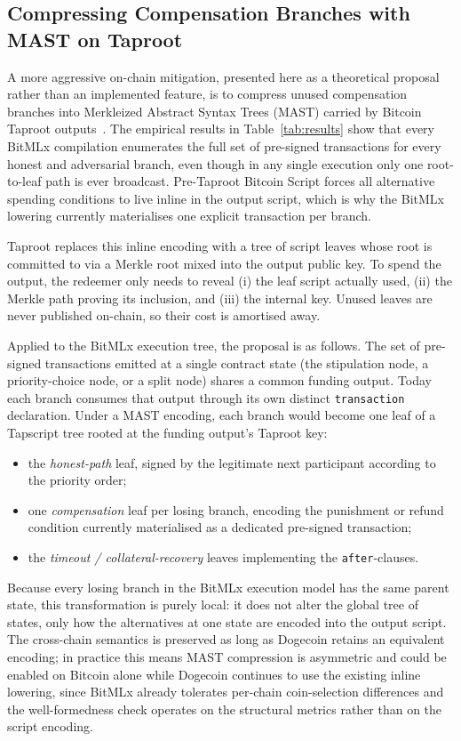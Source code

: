 \documentclass[journal]{IEEEtran}
\begin{document}
\subsection{Compressing Compensation Branches with MAST on Taproot}
\label{sec:mast}

A more aggressive on-chain mitigation, presented here as a theoretical proposal rather than an implemented feature, is to compress unused compensation branches into Merkleized Abstract Syntax Trees (MAST) carried by Bitcoin Taproot outputs~\cite{nick2020bip341,wuille2020bip342}. The empirical results in Table~\ref{tab:results} show that every BitMLx compilation enumerates the full set of pre-signed transactions for every honest and adversarial branch, even though in any single execution only one root-to-leaf path is ever broadcast. Pre-Taproot Bitcoin Script forces all alternative spending conditions to live inline in the output script, which is why the BitMLx lowering currently materialises one explicit transaction per branch.

Taproot replaces this inline encoding with a tree of script leaves whose root is committed to via a Merkle root mixed into the output public key. To spend the output, the redeemer only needs to reveal (i) the leaf script actually used, (ii) the Merkle path proving its inclusion, and (iii) the internal key. Unused leaves are never published on-chain, so their cost is amortised away.

Applied to the BitMLx execution tree, the proposal is as follows. The set of pre-signed transactions emitted at a single contract state (the stipulation node, a priority-choice node, or a split node) shares a common funding output. Today each branch consumes that output through its own distinct \texttt{transaction} declaration. Under a MAST encoding, each branch would become one leaf of a Tapscript tree rooted at the funding output's Taproot key:
\begin{itemize}
\item the \emph{honest-path} leaf, signed by the legitimate next participant according to the priority order;
\item one \emph{compensation} leaf per losing branch, encoding the punishment or refund condition currently materialised as a dedicated pre-signed transaction;
\item the \emph{timeout / collateral-recovery} leaves implementing the \texttt{after}-clauses.
\end{itemize}
Because every losing branch in the BitMLx execution model has the same parent state, this transformation is purely local: it does not alter the global tree of states, only how the alternatives at one state are encoded into the output script. The cross-chain semantics is preserved as long as Dogecoin retains an equivalent encoding; in practice this means MAST compression is asymmetric and could be enabled on Bitcoin alone while Dogecoin continues to use the existing inline lowering, since BitMLx already tolerates per-chain coin-selection differences and the well-formedness check operates on the structural metrics rather than on the script encoding.
\end{document}
